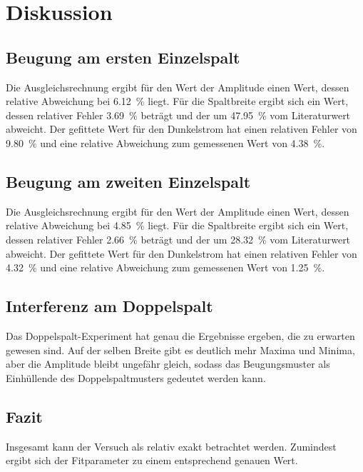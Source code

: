 \section{Diskussion}
\label{sec:Diskussion}

\subsection{Beugung am ersten Einzelspalt}
Die Ausgleichsrechnung ergibt für den Wert der Amplitude einen Wert, dessen relative Abweichung bei \SI{6.12}{\percent} liegt. Für die Spaltbreite ergibt sich ein Wert, dessen relativer Fehler \SI{3.69}{\percent} beträgt und der um \SI{47.95}{\percent} vom Literaturwert abweicht.
Der gefittete Wert für den Dunkelstrom hat einen relativen Fehler von \SI{9.80}{\percent} und eine relative Abweichung zum gemessenen Wert von \SI{4.38}{\percent}.


\subsection{Beugung am zweiten Einzelspalt}
Die Ausgleichsrechnung ergibt für den Wert der Amplitude einen Wert, dessen relative Abweichung bei \SI{4.85}{\percent} liegt. Für die Spaltbreite ergibt sich ein Wert, dessen relativer Fehler \SI{2.66}{\percent} beträgt und der um \SI{28.32}{\percent} vom Literaturwert abweicht.
Der gefittete Wert für den Dunkelstrom hat einen relativen Fehler von \SI{4.32}{\percent} und eine relative Abweichung zum gemessenen Wert von \SI{1.25}{\percent}.

\subsection{Interferenz am Doppelspalt}
Das Doppelspalt-Experiment hat genau die Ergebnisse ergeben, die zu erwarten gewesen sind. Auf der selben Breite gibt es deutlich mehr Maxima und Minima, aber die Amplitude bleibt ungefähr gleich, sodass das Beugungsmuster als Einhüllende des Doppelspaltmusters gedeutet werden kann. 

\subsection{Fazit} 
Insgesamt kann der Versuch als relativ exakt betrachtet werden. Zumindest ergibt sich der Fitparameter zu einem entsprechend genauen Wert. 

\newpage
